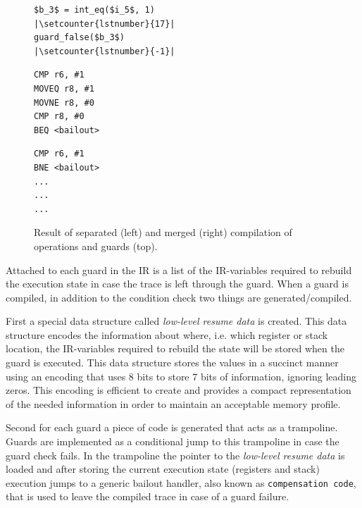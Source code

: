 \documentclass[10pt,preprint]{sigplanconf}
\begin{document}
\begin{figure}[ht]
  \noindent
  \centering
  \begin{minipage}{1\columnwidth}
\begin{lstlisting}[mathescape, numbers=right, escapechar=|, firstnumber=18]
$b_3$ = int_eq($i_5$, 1)                    |\setcounter{lstnumber}{17}|
guard_false($b_3$)                          |\setcounter{lstnumber}{-1}|
\end{lstlisting}
  \end{minipage}
  \begin{minipage}{.40\columnwidth}
    \begin{lstlisting}
CMP r6, #1
MOVEQ r8, #1
MOVNE r8, #0
CMP r8, #0
BEQ <bailout>
    \end{lstlisting}
  \end{minipage}
  \hfill
  \begin{minipage}{.40\columnwidth}
    \begin{lstlisting}
CMP r6, #1
BNE <bailout>
...
...
...
    \end{lstlisting}
  \end{minipage}
  \caption{Result of separated (left) and merged (right) compilation of operations and guards (top).}
  \label{fig:trace-compiled}
\end{figure}

Attached to each guard in the IR is a list of the IR-variables required to
rebuild the execution state in case the trace is left through
the guard. When a guard is compiled, in addition to the
condition check two things are generated/compiled.

First a special data
structure called \emph{low-level resume data} is created. This data structure encodes the
information about where, i.e. which register or stack location, the IR-variables required to rebuild the state will be stored when the guard is executed.
This data
structure stores the values in a succinct manner using an encoding that uses
8 bits to store 7 bits of information, ignoring leading zeros. This encoding is efficient to create and
provides a compact representation of the needed information in order
to maintain an acceptable memory profile.

Second for each guard a piece of code is generated that acts as a trampoline.
Guards are implemented as a conditional jump to this trampoline in case the
guard check fails.
In the trampoline the pointer to the
\emph{low-level resume data} is loaded and after storing the current execution state
(registers and stack) execution jumps to a generic bailout handler, also known
as \texttt{compensation code},
that is used to leave the compiled trace in case of a guard failure.
\end{document}
